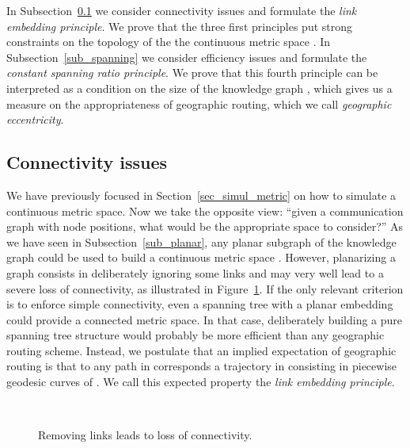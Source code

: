 \documentclass{article}
\begin{document}
In Subsection~\ref{sub_simul_com} we consider connectivity issues and formulate the {\em link embedding principle}. We prove that the three first principles put strong constraints on the topology of the the continuous metric space .
In Subsection~\ref{sub_spanning} we consider efficiency issues and formulate the {\em constant spanning ratio principle}. We prove that this fourth principle can be interpreted as a condition on the size of the knowledge graph , which gives us a measure on the appropriateness of geographic routing, which we call {\em geographic eccentricity}.

\subsection{Connectivity issues}
\label{sub_simul_com}
We have previously focused in Section~\ref{sec_simul_metric} on how to simulate a continuous metric space. Now we take the opposite view: ``given a communication graph  with node positions, what would be the appropriate space to consider?'' As we have seen in Subsection~\ref{sub_planar}, any planar subgraph of the knowledge graph  could be used to build a continuous metric space . However, planarizing a graph consists in deliberately ignoring some links and may very well lead to a severe loss of connectivity, as illustrated in Figure~\ref{fig_cldp}. If the only relevant criterion is to enforce simple connectivity, even a spanning tree with a planar embedding could provide a connected metric space. In that case, deliberately building a pure spanning tree structure would probably be more efficient than any geographic routing scheme. Instead, we postulate that an implied expectation of geographic routing is that to any path in  corresponds a trajectory in  consisting in piecewise geodesic curves of . We call this expected property the {\em link embedding principle}.

\begin{figure}[h]
\begin{center}
\hspace{1cm}
\\
\hspace{1cm}
\caption{Removing links leads to loss of connectivity.}
\label{fig_cldp}
\end{center}
\end{figure}
\end{document}
